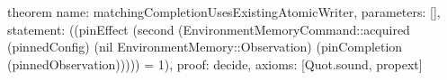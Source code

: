 theorem{
 name: matchingCompletionUsesExistingAtomicWriter, parameters: [],
 statement: ((pinEffect (second (EnvironmentMemoryCommand::acquired (pinnedConfig) (nil EnvironmentMemory::Observation) (pinCompletion (pinnedObservation))))) = 1), proof: decide{}, axioms: [Quot.sound, propext]
}
